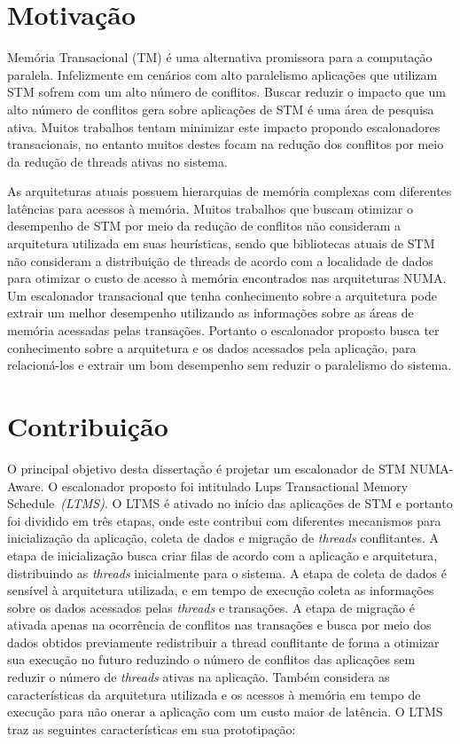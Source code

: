 \documentclass[diss,capa]{texufpel}
\begin{document}
\section{Motivação}

Memória Transacional (TM) é uma alternativa promissora para a computação paralela. Infelizmente em cenários com alto paralelismo aplicações que utilizam STM sofrem com um alto número de conflitos. Buscar reduzir o impacto que um alto número de conflitos gera sobre aplicações de STM é uma área de pesquisa ativa. Muitos trabalhos tentam minimizar este impacto propondo escalonadores transacionais, no entanto muitos destes focam na redução dos conflitos por meio da redução de threads ativas no sistema.

As arquiteturas atuais possuem hierarquias de memória complexas com diferentes latências para acessos à memória. Muitos trabalhos que buscam otimizar o desempenho de STM por meio da redução de conflitos não consideram a arquitetura utilizada em suas heurísticas, sendo que bibliotecas atuais de STM não consideram a distribuição de threads de acordo com a localidade de dados para otimizar o custo de acesso à memória encontrados nas arquiteturas NUMA. Um escalonador transacional que tenha conhecimento sobre a arquitetura pode extrair um melhor desempenho utilizando as informações sobre as áreas de memória acessadas pelas transações. Portanto o escalonador proposto busca ter conhecimento sobre a arquitetura e os dados acessados pela aplicação, para relacioná-los e extrair um bom desempenho sem reduzir o paralelismo do sistema.

\section{Contribuição}

O principal objetivo desta dissertação é projetar um escalonador de STM NUMA-Aware. O escalonador proposto foi intitulado Lups Transactional Memory Schedule~\emph{(LTMS)}. O LTMS é ativado no início das aplicações de STM e portanto foi dividido em três etapas, onde este contribui com diferentes mecanismos para inicialização da aplicação, coleta de dados e migração de \emph{threads} conflitantes. A etapa de inicialização busca criar filas de acordo com a aplicação e arquitetura, distribuindo as \emph{threads} inicialmente para o sistema. A etapa de coleta de dados é sensível à arquitetura utilizada, e em tempo de execução coleta as informações sobre os dados acessados pelas \emph{threads} e transações. A etapa de migração é ativada apenas na ocorrência de conflitos nas transações e busca por meio dos dados obtidos previamente redistribuir a thread conflitante de forma a otimizar sua execução no futuro reduzindo o número de conflitos das aplicações sem reduzir o número de \emph{threads} ativas na aplicação. Também considera as características da arquitetura utilizada e os acessos à memória em tempo de execução para não onerar a aplicação com um custo maior de latência. O LTMS traz as seguintes características em sua prototipação:
\end{document}
